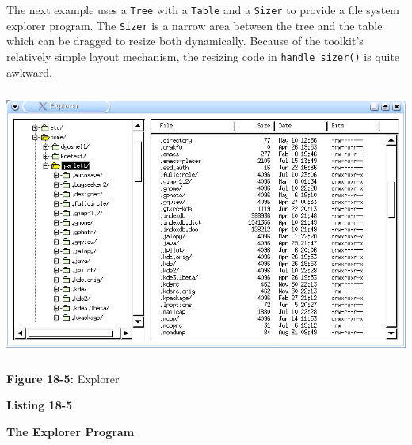 The next example uses a \texttt{Tree} with a \texttt{Table} and a
\texttt{Sizer} to provide a file system explorer program.
The \texttt{Sizer} is a narrow area between
the tree and the table which can be dragged to resize both dynamically.
Because of the toolkit's relatively simple layout
mechanism, the resizing code in \texttt{handle\_sizer()} is quite
awkward.



\begin{center}
\includegraphics[width=5.8134in,height=3.4898in]{ub-img/ub-img54.jpg}
\end{center}

{\sffamily\bfseries Figure 18-5:}
{\sffamily Explorer}


\bigskip

{\sffamily\bfseries
Listing 18-5}

{\sffamily\bfseries
The Explorer Program}

